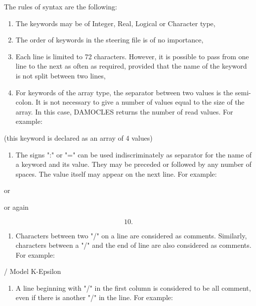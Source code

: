  The rules of syntax are the following:

\begin{enumerate}
\item  The keywords may be of Integer, Real, Logical or Character type,

\item  The order of keywords in the steering file is of no importance,

\item  Each line is limited to 72 characters. However, it is possible to pass from one line to the next as often as required, provided that the name of the keyword is not split between two lines,

\item  For keywords of the array type, the separator between two values is the semi-colon. It is not necessary to give a number of values equal to the size of the array. In this case, DAMOCLES returns the number of read values. For example:
\end{enumerate}


 (this keyword is declared as an array of 4 values)

\begin{enumerate}
\item  The signs ":" or "=" can be used indiscriminately as separator for the name of a keyword and its value. They may be preceded or followed by any number of spaces. The value itself may appear on the next line. For example:
\end{enumerate}


or


or again

\[10.\]

\begin{enumerate}
\item \textit{ }Characters between two "/" on a line are considered as comments. Similarly, characters between a "/" and the end of line are also considered as comments. For example:
\end{enumerate}

      / Model K-Epsilon

\begin{enumerate}
\item  A line beginning with "/" in the first column is considered to be all comment, even if there is another "/" in the line. For example:
\end{enumerate}

